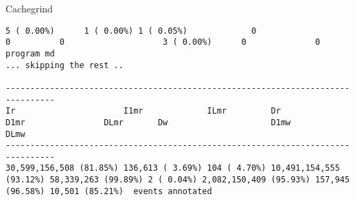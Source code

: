 \documentclass[10pt,t]{beamer}
\begin{document}
\begin{frame}{Cachegrind}
\begin{itemize}
\begin{lstlisting}[basicstyle=\fontsize{4.5}{5.5}\selectfont\ttfamily]
            5 ( 0.00%)      1 ( 0.00%) 1 ( 0.05%)             0                   0          0                    3 ( 0.00%)      0              0           program md
... skipping the rest ..

--------------------------------------------------------------------------------
Ir                      I1mr             ILmr         Dr                      D1mr                DLmr       Dw                     D1mw             DLmw
--------------------------------------------------------------------------------
30,599,156,508 (81.85%) 136,613 ( 3.69%) 104 ( 4.70%) 10,491,154,555 (93.12%) 58,339,263 (99.89%) 2 ( 0.04%) 2,082,150,409 (95.93%) 157,945 (96.58%) 10,501 (85.21%)  events annotated
      \end{lstlisting}
  \end{itemize}
\end{frame}
\end{document}
